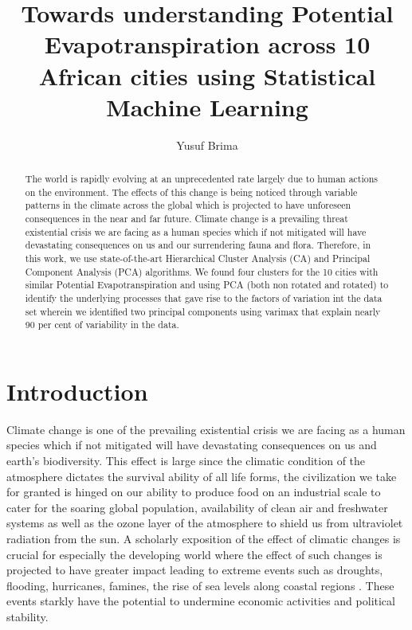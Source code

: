 \documentclass[12pt,a4paper]{article}
\author{Yusuf Brima}
\title{Towards understanding Potential Evapotranspiration across 10 African cities using Statistical Machine Learning}
\begin{document}
\maketitle
\thispagestyle{empty}
\pagebreak
\begin{abstract}
The world is rapidly evolving at an unprecedented rate largely due to human actions on the environment. The effects of  this  change is being noticed through variable patterns in the climate across the global which is projected to have unforeseen consequences in the near and far future. Climate change is a prevailing threat existential crisis we are facing as a human species which if not mitigated will have devastating consequences on us and our surrendering fauna and flora. Therefore,  in this work,  we use state-of-the-art Hierarchical Cluster Analysis (CA) and Principal Component Analysis (PCA) algorithms. We found four clusters for the 10 cities with similar Potential Evapotranspiration and using PCA (both non rotated and rotated) to identify the underlying processes that gave rise to the factors of variation int the data set wherein we identified two principal components using varimax that explain nearly 90 per cent of variability in the data. 
\end{abstract}
\pagebreak
\tableofcontents
\pagebreak
\section{Introduction}
Climate change is one of the prevailing  existential crisis we are facing as a human species which if not mitigated will have devastating consequences on us and earth's biodiversity. This effect is large since the climatic condition of the atmosphere dictates the survival ability of all life forms, the civilization we take for granted is hinged on our ability to produce food on an industrial scale to cater for the soaring global population, availability of clean air and freshwater systems as well as the ozone layer of the atmosphere to shield us from ultraviolet radiation from the sun.
A scholarly exposition of the effect of climatic changes is crucial for especially the developing world where the effect of such changes is projected to have greater impact leading to extreme events such as droughts, flooding,  hurricanes, famines, the rise of sea levels along coastal regions \cite{mitchell1989greenhouse, wang2018effect}.  These events starkly have the potential to undermine economic activities and political stability. 
\end{document}
